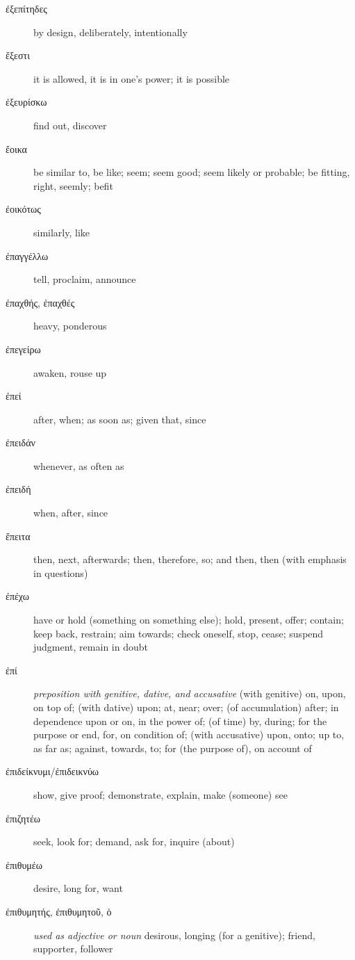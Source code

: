 \documentclass[12pt,letterpaper]{article}
\begin{document}
\begin{description}
    \item[\textgreek{ἐξεπίτηδες}] by design, deliberately, intentionally
    \item[\textgreek{ἔξεστι}] it is allowed, it is in one's power; it is possible
    \item[\textgreek{ἐξευρίσκω}] find out, discover
    \item[\textgreek{ἔοικα}] \marginnote{*}be similar to, be like; seem; seem good; seem likely or probable; be fitting, right, seemly; befit
    \item[\textgreek{ἐοικότως}] similarly, like
    \item[\textgreek{ἐπαγγέλλω}] tell, proclaim, announce
    \item[\textgreek{ἐπαχθής, ἐπαχθές}] heavy, ponderous
    \item[\textgreek{ἐπεγείρω}] awaken, rouse up
    \item[\textgreek{ἐπεί}] \marginnote{*}after, when; as soon as; given that, since
    \item[\textgreek{ἐπειδάν}] whenever, as often as
    \item[\textgreek{ἐπειδή}] when, after, since
    \item[\textgreek{ἔπειτα}] \marginnote{*}then, next, afterwards; then, therefore, so; and then, then (with emphasis in questions)
    \item[\textgreek{ἐπέχω}] have or hold (something on something else); hold, present, offer; contain; keep back, restrain; aim towards; check oneself, stop, cease; suspend judgment, remain in doubt
    \item[\textgreek{ἐπί}] \marginnote{*}\textit{preposition with genitive, dative, and accusative} (with genitive) on, upon, on top of; (with dative) upon; at, near; over; (of accumulation) after; in dependence upon or on, in the power of; (of time) by, during; for the purpose or end, for, on condition of; (with accusative) upon, onto; up to, as far as; against, towards, to; for (the purpose of), on account of
    \item[\textgreek{ἐπιδείκνυμι/ἐπιδεικνύω}] show, give proof; demonstrate, explain, make (someone) see
    \item[\textgreek{ἐπιζητέω}] seek, look for; demand, ask for, inquire (about)
    \item[\textgreek{ἐπιθυμέω}] desire, long for, want
    \item[\textgreek{ἐπιθυμητής, ἐπιθυμητοῦ, ὁ}] \textit{used as adjective or noun} desirous, longing (for a genitive); friend, supporter, follower

\end{description}
\end{document}
